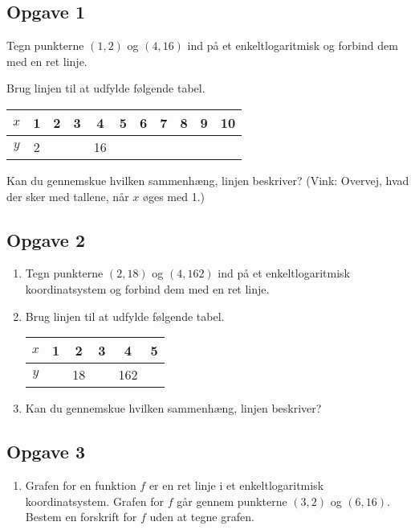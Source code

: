 \documentclass[12pt]{article}
\begin{document}
\subsection*{Opgave 1}
\begin{enumerate}[label=\roman*)]
	\item Tegn punkterne $(1,2)$ og $(4,16)$ ind på et enkeltlogaritmisk og forbind dem med en ret 
	linje.
	\item Brug linjen til at udfylde følgende tabel.
	\begin{center}
		\begin{tabular}{c|c|c|c|c|c|c|c|c|c|c}
			$x$ & 1 & 2 & 3 & 4 & 5 & 6 & 7 & 8 & 9 & 10 \\
			\hline
			$y$ & 2 & \phantom{4}  & \phantom{8}  &16 & \phantom{32}  & \phantom{64}  & \phantom{128}  & \phantom{256}  & \phantom{512}  & \phantom{1024}
		\end{tabular}
	\item Kan du gennemskue hvilken sammenhæng, linjen beskriver? (Vink: Overvej, hvad der sker med
	tallene, når $x$ øges med 1.)
	\end{center}
\end{enumerate}

\subsection*{Opgave 2}
\begin{enumerate}[label=\roman*)]
	\item Tegn punkterne $(2,18)$ og $(4,162)$ ind på et enkeltlogaritmisk koordinatsystem og forbind dem med en ret 
	linje.
	\item Brug linjen til at udfylde følgende tabel.
	\begin{center}
		\begin{tabular}{c|c|c|c|c|c}
			$x$ & 1 & 2 & 3 & 4 & 5  \\
			\hline
			$y$ & \phantom{6} & 18 & \phantom{54} & 162 & \phantom{486}
		\end{tabular}
	\end{center}
	\item Kan du gennemskue hvilken sammenhæng, linjen beskriver? 
\end{enumerate}

\subsection*{Opgave 3}

\begin{enumerate}[label=\roman*)]
	\item Grafen for en funktion $f$ er en ret linje i et enkeltlogaritmisk koordinatsystem. Grafen for $f$ går 
	gennem punkterne $(3,2)$ og $(6,16)$. Bestem en forskrift for $f$ uden at tegne grafen.
\end{enumerate}
\end{document}
